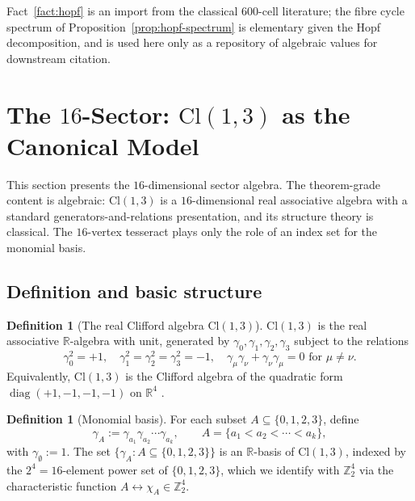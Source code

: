 \documentclass[11pt, a4paper]{amsart}
\theoremstyle{definition}
\newtheorem{definition}[theorem]{Definition}
\newcommand{\R}{\mathbb{R}}
\newcommand{\Z}{\mathbb{Z}}
\newcommand{\Cl}{\mathrm{Cl}}
\begin{document}
Fact~\ref{fact:hopf} is an import from the classical $600$-cell
literature; the fibre cycle spectrum of
Proposition~\ref{prop:hopf-spectrum} is elementary given the Hopf
decomposition, and is used here only as a repository of algebraic
values for downstream citation.

\section{The $16$-Sector: $\Cl(1,3)$ as the Canonical Model}
\label{sec:16-sector}

This section presents the $16$-dimensional sector algebra. The
theorem-grade content is algebraic: $\Cl(1,3)$ is a $16$-dimensional
real associative algebra with a standard generators-and-relations
presentation, and its structure theory is classical. The
$16$-vertex tesseract plays only the role of an index set for the
monomial basis.

\subsection{Definition and basic structure}

\begin{definition}[The real Clifford algebra $\Cl(1,3)$]
\label{def:Cl}
$\Cl(1,3)$ is the real associative $\R$-algebra with unit,
generated by $\gamma_0, \gamma_1, \gamma_2, \gamma_3$ subject to
the relations
\[
  \gamma_0^2 = +1, \quad
  \gamma_1^2 = \gamma_2^2 = \gamma_3^2 = -1, \quad
  \gamma_\mu \gamma_\nu + \gamma_\nu \gamma_\mu = 0
  \text{ for } \mu \neq \nu.
\]
Equivalently, $\Cl(1,3)$ is the Clifford algebra of the quadratic
form $\operatorname{diag}(+1, -1, -1, -1)$ on $\R^4$
\cite[Ch.~16]{Lounesto}.
\end{definition}

\begin{definition}[Monomial basis]
\label{def:Cl-basis}
For each subset $A \subseteq \{0, 1, 2, 3\}$, define
\[
  \gamma_A := \gamma_{a_1} \gamma_{a_2} \cdots \gamma_{a_k},
  \qquad A = \{a_1 < a_2 < \cdots < a_k\},
\]
with $\gamma_\emptyset := 1$. The set $\{\gamma_A : A \subseteq
\{0, 1, 2, 3\}\}$ is an $\R$-basis of $\Cl(1,3)$, indexed by the
$2^4 = 16$-element power set of $\{0, 1, 2, 3\}$, which we
identify with $\Z_2^4$ via the characteristic function $A
\leftrightarrow \chi_A \in \Z_2^4$.
\end{definition}
\end{document}
